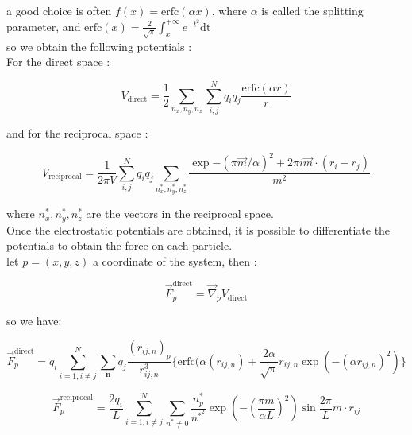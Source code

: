 \documentclass[12pt,twoside,a4paper]{report}
\begin{document}
a good choice is often $f(x) = \text{erfc}(\alpha x)$, where $\alpha$ is called the splitting parameter, and $\text{erfc}(x) = \frac{2}{\sqrt{\pi}} \int_{x}^{+\infty}{e^{-t^2}\text{dt}} $\\

so we obtain the following potentials :\\

For the direct space :

\begin{equation}
   V_{\text{direct}} =  \frac{1}{2} \sum_{n_x,n_y,n_z} \sum_{i,j}^{N} q_i q_j \frac{\text{erfc}(\alpha r)}{r}
\end{equation}

and for the reciprocal space :

\begin{equation}
\label{Vrecip}
	V_{\text{reciprocal}} = \frac{1}{2 \pi V} \sum_{i,j}^{N} q_i q_j \sum_{n_x^*,n_y^*,n_z^*}\frac{\exp{-(\pi \overrightarrow{m}/\alpha)^2} +2\pi i \overrightarrow{m} \cdot (r_i - r_j)}{m^2}
\end{equation}

where $n_x^*,n_y^*,n_z^*$ are the vectors in the reciprocal space.\\


Once the electrostatic potentials are obtained, it is possible to differentiate the potentials to obtain the force on each particle.\\

let $p = (x,y,z)$ a coordinate of the system, then :


\begin{equation}
   \overrightarrow{F}_p^{\text{direct}} = \overrightarrow{\nabla}_p V_{\text{direct}} 
\end{equation}


so we have:

\begin{equation}
\label{ewaldDirect}
   \overrightarrow{F}_p^{\text{direct}} = q_i \sum\limits_{i=1,i\neq j}^N \sum\limits_{\textbf{n}} q_j \frac{(r_{ij,n})_p}{r_{ij,n}^3}
   \{\text{erfc}(\alpha (r_{ij,n}) + \frac{2\alpha}{\sqrt{\pi}} r_{ij,n} \exp(-(\alpha r_{ij,n})^2)\}
\end{equation}


\begin{equation}
\label{ewaldReciprocal}
   \overrightarrow{F}_p^{\text{reciprocal}} = \frac{2 q_i}{L} \sum\limits_{i=1,i\neq j}^N \sum_{n^* \neq 0} \frac{n_p^*}{n^{*^2}} \exp{(-(\frac{\pi m}{\alpha L})^2)}\sin{\frac{2\pi}{L} m \cdot r_{ij} }
\end{equation}
\end{document}
